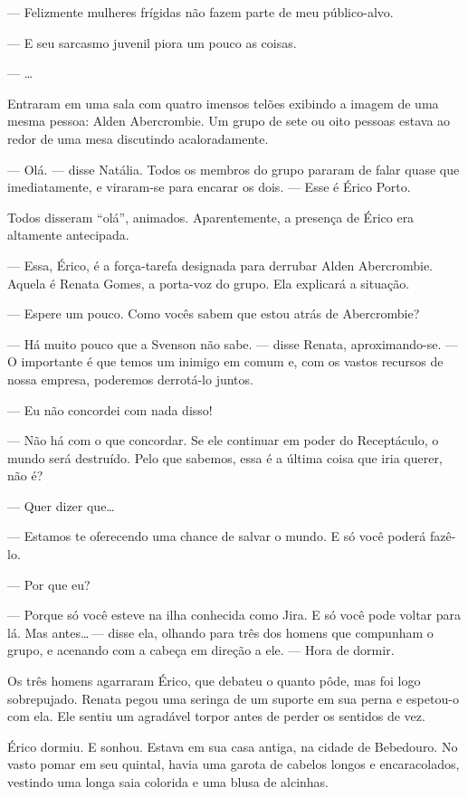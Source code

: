 --- Felizmente mulheres frígidas não fazem parte de meu público-alvo.

--- E seu sarcasmo juvenil piora um pouco as coisas.

--- \ldots

Entraram em uma sala com quatro imensos telões exibindo a imagem de uma mesma
pessoa: Alden Abercrombie. Um grupo de sete ou oito pessoas estava ao redor de
uma mesa discutindo acaloradamente.

--- Olá. --- disse Natália. Todos os membros do grupo pararam de falar quase
que imediatamente, e viraram-se para encarar os dois. --- Esse é Érico Porto.

Todos    disseram “olá”, animados. Aparentemente, a presença de Érico era
altamente antecipada.

--- Essa, Érico, é a força-tarefa designada para derrubar Alden Abercrombie.
Aquela é Renata Gomes, a porta-voz do grupo. Ela explicará a situação.

--- Espere um pouco. Como vocês sabem que estou atrás de Abercrombie?

--- Há muito pouco que a Svenson não sabe. --- disse Renata, aproximando-se.
--- O importante é que temos um inimigo em comum e, com os vastos recursos de
nossa empresa, poderemos derrotá-lo juntos.

--- Eu não concordei com nada disso!

--- Não há com o que concordar. Se ele continuar em poder do Receptáculo, o
mundo será destruído. Pelo que sabemos, essa é a última coisa que iria querer,
não é?

--- Quer dizer que\ldots

--- Estamos te oferecendo uma chance de salvar o mundo. E só você poderá
fazê-lo.

--- Por que eu?

--- Porque só você esteve na ilha conhecida como Jira. E só você pode voltar
para lá. Mas antes\ldots\,--- disse ela, olhando para três dos homens que
compunham o grupo, e acenando com a cabeça em direção a ele. --- Hora de
dormir.

Os três homens agarraram Érico, que debateu o quanto pôde, mas foi logo
sobrepujado. Renata pegou uma seringa de um suporte em sua perna e espetou-o
com ela. Ele sentiu um agradável torpor antes de perder os sentidos de vez.

\espaco

Érico dormiu. E sonhou. Estava em sua casa antiga, na cidade de Bebedouro. No
vasto pomar em seu quintal, havia uma garota de cabelos longos e encaracolados,
vestindo uma longa saia colorida e uma blusa de alcinhas.


